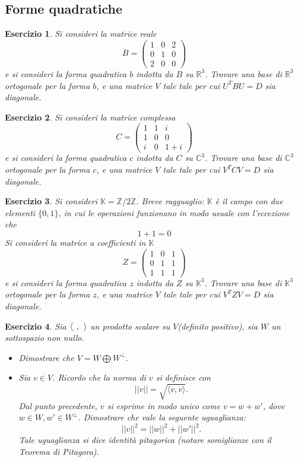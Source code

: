 \documentclass{article}
\newtheorem{es}{Esercizio}
\begin{document}
{\subsection{Forme quadratiche}


\begin{es}
    Si consideri la matrice reale 
    $$B=\begin{pmatrix}
        1 & 0 & 2\\
        0 & 1 & 0\\
        2 & 0 & 0
    \end{pmatrix}$$ e si consideri la forma quadratica $b$ indotta da $B$ su $\mathbb{R}^3$. Trovare una base di $\mathbb{R}^3$ ortogonale per la forma $b$, e una matrice $V$ tale tale per cui $U^T B U=D$ sia diagonale.
\end{es}


\begin{es}
    Si consideri la matrice complessa 
    $$C=\begin{pmatrix}
        1 & 1 & i\\
        1 & 0 & 0\\
        i & 0 & 1+i
    \end{pmatrix}$$ e si consideri la forma quadratica $c$ indotta da $C$ su $\mathbb{C}^3$. Trovare una base di $\mathbb{C}^3$ ortogonale per la forma $c$, e una matrice $V$ tale tale per cui $V^T C V=D$ sia diagonale.
\end{es}

\begin{es}
    Si consideri $\mathbb{K}=\mathbb{Z}/2\mathbb{Z}$. Breve ragguaglio: $\mathbb{K}$ è il campo con due elementi $\{0,1\}$, in cui le operazioni funzionano in modo usuale con l'eccezione che $$1+1=0$$
    Si consideri la matrice a coefficienti in $\mathbb{K}$ 
    $$Z=\begin{pmatrix}
        1 & 0 & 1\\
        0 & 1 & 1\\
        1 & 1 & 1
    \end{pmatrix}$$ e si consideri la forma quadratica $z$ indotta da $Z$ su $\mathbb{K}^3$. Trovare una base di $\mathbb{K}^3$ ortogonale per la forma $z$, e una matrice $V$ tale tale per cui $V^T Z V=D$ sia diagonale.
\end{es}

\begin{es}
    Sia $\langle \hspace{0.15cm}, \hspace{0.15cm} \rangle$ un prodotto scalare su $V$(definito positivo), sia $W$ un sottospazio non nullo. 
    \begin{itemize}
        \item Dimostrare che $V=W\bigoplus W^\perp$.
        \item Sia $v\in V$. Ricordo che la norma di $v$ si definisce con $$ ||v||=\sqrt{\langle v,v \rangle}.
        $$ Dal punto precedente, $v$ si esprime in modo unico come $v=w+w'$, dove $w\in W, w'\in W^\perp$. Dimostrare che vale la seguente uguaglianza:$$||v||^2=||w||^2+||w'||^2.
        $$
        Tale uguaglianza si dice identità pitagorica (notare somiglianze con il Teorema di Pitagora).
    \end{itemize}
\end{es}

}
\end{document}
